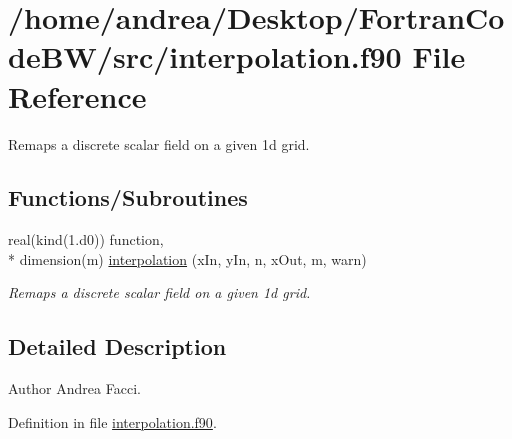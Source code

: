 \hypertarget{interpolation_8f90}{\section{/home/andrea/\-Desktop/\-Fortran\-Code\-B\-W/src/interpolation.f90 File Reference}
\label{interpolation_8f90}
}


Remaps a discrete scalar field on a given 1d grid.  


\subsection*{Functions/\-Subroutines}
\begin{DoxyCompactItemize}
\item 
real(kind(1.d0)) function, \\*
dimension(m) \hyperlink{interpolation_8f90_abf4c9a66d390bb689405c6a16a088575}{interpolation} (x\-In, y\-In, n, x\-Out, m, warn)
\begin{DoxyCompactList}\small\item\em Remaps a discrete scalar field on a given 1d grid. \end{DoxyCompactList}\end{DoxyCompactItemize}


\subsection{Detailed Description}
\begin{DoxyAuthor}{Author}
Andrea Facci. 
\end{DoxyAuthor}


Definition in file \hyperlink{interpolation_8f90_source}{interpolation.\-f90}.



